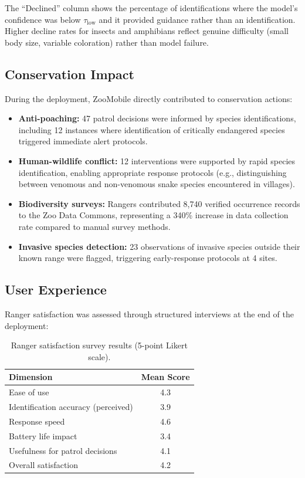 The ``Declined'' column shows the percentage of identifications where the model's confidence was below $\tau_{\text{low}}$ and it provided guidance rather than an identification.
Higher decline rates for insects and amphibians reflect genuine difficulty (small body size, variable coloration) rather than model failure.

\subsection{Conservation Impact}

During the deployment, ZooMobile directly contributed to conservation actions:

\begin{itemize}[leftmargin=*]
    \item \textbf{Anti-poaching:} 47 patrol decisions were informed by species identifications, including 12 instances where identification of critically endangered species triggered immediate alert protocols.
    \item \textbf{Human-wildlife conflict:} 12 interventions were supported by rapid species identification, enabling appropriate response protocols (e.g., distinguishing between venomous and non-venomous snake species encountered in villages).
    \item \textbf{Biodiversity surveys:} Rangers contributed 8,740 verified occurrence records to the Zoo Data Commons, representing a 340\% increase in data collection rate compared to manual survey methods.
    \item \textbf{Invasive species detection:} 23 observations of invasive species outside their known range were flagged, triggering early-response protocols at 4 sites.
\end{itemize}

\subsection{User Experience}

Ranger satisfaction was assessed through structured interviews at the end of the deployment:

\begin{table}[H]
\centering
\caption{Ranger satisfaction survey results (5-point Likert scale).}
\label{tab:satisfaction}
\begin{tabular}{@{}lc@{}}
\toprule
\textbf{Dimension} & \textbf{Mean Score} \\
\midrule
Ease of use & 4.3 \\
Identification accuracy (perceived) & 3.9 \\
Response speed & 4.6 \\
Battery life impact & 3.4 \\
Usefulness for patrol decisions & 4.1 \\
Overall satisfaction & 4.2 \\
\bottomrule
\end{tabular}
\end{table}


